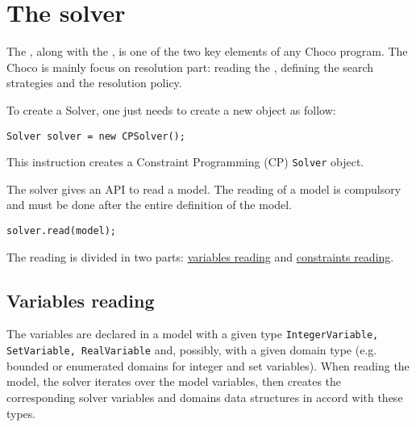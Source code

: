 \label{solver}
\hypertarget{solver}{}


\chapter{The solver}\label{solver:thesolver}\hypertarget{solver:thesolver}{}



The , along with the , is one of the two key elements of any Choco program. The Choco  is mainly focus on resolution part: reading the , defining the search strategies and the resolution policy.  

To create a \gls{Solver}, one just needs to create a new object as follow:
\begin{lstlisting}
Solver solver = new CPSolver();
\end{lstlisting}
This instruction creates a Constraint Programming (CP) {\tt Solver} object.

The solver gives an API to read a model. The reading of a model is compulsory and must be done after the entire definition of the model. 
\begin{lstlisting}
solver.read(model);
\end{lstlisting}
The reading is divided in two parts: \hyperlink{solver:variablesreading}{variables reading} and \hyperlink{solver:constraintsreading}{constraints reading}.

\section{Variables reading}\label{solver:variablesreading}\hypertarget{solver:variablesreading}{}
The variables are declared in a model with a given type \texttt{IntegerVariable, SetVariable, RealVariable} and, possibly, with a given domain type (e.g. bounded or enumerated domains for integer and set variables).
When reading the model, the solver iterates over the model variables, then creates the corresponding solver variables and domains data structures in accord with these types.

